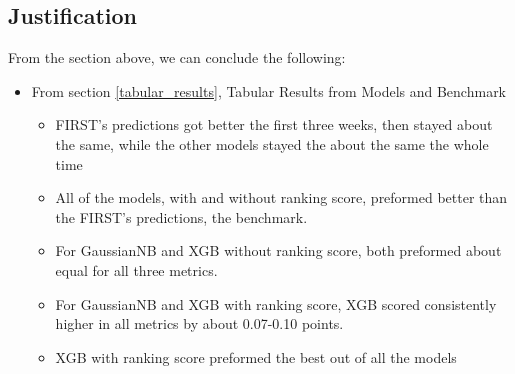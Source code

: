 \documentclass{article}
\begin{document}
\subsection{Justification} \label{Justification}
\par
From the section above, we can conclude the following:
\begin{itemize}
    \item From section \ref{tabular_results}, Tabular Results from Models and Benchmark
    \begin{itemize}
        \item FIRST's predictions got better the first three weeks, then stayed about the same, while the other models stayed the about the same the whole time
        \item All of the models, with and without ranking score, preformed better than the FIRST's predictions, the benchmark.
        \item For GaussianNB and XGB without ranking score, both preformed about equal for all three metrics.
        \item For GaussianNB and XGB with ranking score, XGB scored consistently higher in all metrics by about 0.07-0.10 points.
        \item XGB with ranking score preformed the best out of all the models
    \end{itemize}
    

\end{itemize}
\end{document}

